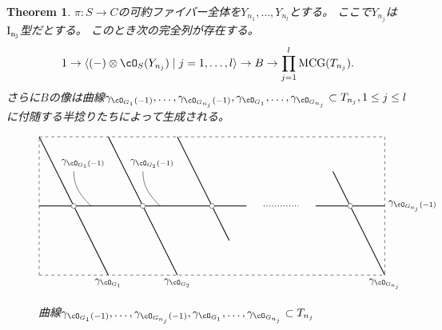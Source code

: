 \documentclass[uplatex,a4paper,dvipdfmx]{jsarticle}
\theoremstyle{plain}
\newtheorem{theorem}{Theorem}[section]
\theoremstyle{definition}
\DeclareMathOperator{\MCG}{\mathrm{MCG}}
\begin{document}
\begin{theorem}
	$\pi \colon S \to C$の可約ファイバー全体を$Y_{n_1}, \dots, Y_{n_l}$とする。
	ここで$Y_{n_j}$は$\rm{I}_{n_j}$型だとする。
	このとき次の完全列が存在する。
	\begin{equation}
		1 \to \langle (-)\otimes \cO_S(Y_{n_j}) \mid j = 1, \dots, l\rangle \to B \to \prod_{j=1}^l \MCG(T_{n_j}).
	\end{equation}
	さらに$B$の像は曲線$\gamma_{\cO_{G_1}(-1)}, \dots, \gamma_{\cO_{G_{n_j}}(-1)}, \gamma_{\cO_{G_1}}, \dots, \gamma_{\cO_{G_{n_j}}} \subset T_{n_j}, 1\leq j \leq l$に付随する半捻りたちによって生成される。
	\begin{figure}[h]
		\centering
		\begin{displaymath}
			\begin{tikzpicture}[scale=1.2]
				\draw[dashed] (0,0)--(10,0);
				\draw[dashed] (0,0)--(0,4);
				\draw[dashed] (0,4)--(10,4);
				\draw[dashed] (10,4)--(10,0);

				\draw[thick] (0, 2)--(1, 2);
				\draw[thick] (1, 2)--(3, 2);
				\draw[thick] (3, 2)--(5, 2);
				\draw[thick] (5, 2)--(6, 2);
				\draw[thick] (8, 2)--(9, 2);
				\draw[thick] (9, 2)--(10, 2);


				\draw[thick] (0, 4)--(1, 2);
				\draw[thick] (1, 2)--(2, 0);
				\draw[thick] (2, 4)--(4, 0);
				\draw[thick] (4, 4)--(5, 2);
				\draw[thick] (5, 2)--(5.5, 1);
				\draw[thick] (8.5, 3)--(9, 2);
				\draw[thick] (9, 2)--(10, 0);

				\draw[dotted, thick] (5+1.5, 2)--(9-1.5, 2);
				\foreach \u in {1, 3, 5, 9}
					{
						\filldraw[white] (\u, 2) circle (2pt);
						\draw[black] (\u, 2) circle (2pt);
					}

				\draw(2, 0) node[below]{$\gamma_{\cO_{G_1}}$};
				\draw(4, 0) node[below]{$\gamma_{\cO_{G_2}}$};
				\draw(10, 0) node[below]{$\gamma_{\cO_{G_{n_j}}}$};

				\draw(2, 3) node[above left]{$\gamma_{\cO_{G_1}(-1)}$};
				\draw(1, 3) to[out=-90,in=135](1.5, 2);
				\draw(4, 3) node[above left]{$\gamma_{\cO_{G_2}(-1)}$};
				\draw(3, 3) to[out=-90,in=135](3.5, 2);

				\draw(10, 2) node[right]{$\gamma_{\cO_{G_{n_j}}(-1)}$};

			\end{tikzpicture}
		\end{displaymath}
		\caption{曲線$\gamma_{\cO_{G_1}(-1)}, \dots, \gamma_{\cO_{G_{n_j}}(-1)}, \gamma_{\cO_{G_1}}, \dots, \gamma_{\cO_{G_{n_j}}} \subset T_{n_j}$}
	\end{figure}
\end{theorem}


\end{document}

